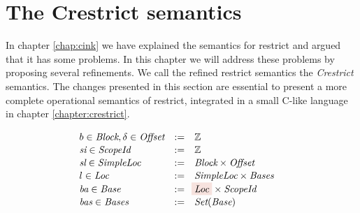 \chapter{The Crestrict semantics}\label{chapt:improved-semantics}
In chapter \ref{chap:cink} we have explained the \cink{} semantics for restrict and argued that it has some problems. 
In this chapter we will address these problems by proposing several refinements.
We call the refined \cink{} restrict semantics the \textit{Crestrict} semantics.
The changes presented in this section are essential to present a more complete operational semantics of restrict,
integrated in a small C-like language in chapter \ref{chapter:crestrict}.

\setlength{\fboxsep}{2pt}
\begin{figure}[htb]
\[\def\arraystretch{1.1}
\begin{array}{lrll}
b \in \Block, \delta \in \Offset            &   :=          & \mathbb{Z}                                                      & \\
\Scopeidvar \in \Scopeid                    &   :=          & \mathbb{Z}                                                      & \\
\Simplelocvar \in \Simpleloc                &   :=          & \Block \times \Offset                                           & \\
l \in \Loc                                  &   :=          & \Simpleloc \times \Bases                                   & \\
\Basevar \in \Base                          &   :=          & \highlightchangem{\Loc} \times \Scopeid \\
\Basesvar \in \Bases                        &   :=          & \Set{\Base}                                                     & \\


\end{array}\]
\end{figure}
